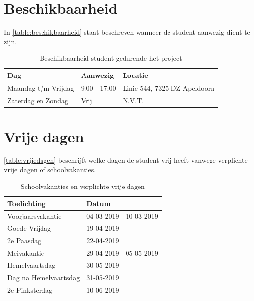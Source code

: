 \documentclass[a4paper, 11pt, oneside]{report}
\begin{document}
\section{Beschikbaarheid}
In \autoref{table:beschikbaarheid} staat beschreven wanneer de student aanwezig dient te zijn.

\begin{table}[H]
	\centering
	\begin{tabular}{|l|l|l|}
		\hline
		\rowcolor[HTML]{C0C0C0} 
		Dag                 & Aanwezig     & Locatie                                        \\ \hline
		Maandag t/m Vrijdag & 9:00 - 17:00 & Linie 544, 7325 DZ Apeldoorn 					\\ \hline
		Zaterdag en Zondag  & Vrij         & N.V.T.                                         \\ \hline
	\end{tabular}
\caption{Beschikbaarheid student gedurende het project}
\label{table:beschikbaarheid}
\end{table}

\section{Vrije dagen}

\autoref{table:vrijedagen} beschrijft welke dagen de student vrij heeft vanwege verplichte vrije dagen of schoolvakanties.

\begin{table}[H]
	\centering
	\begin{tabular}{|l|l|}
		\hline
		\rowcolor[HTML]{C0C0C0} 
		Toelichting           & Datum                           \\ \hline
		Voorjaarsvakantie     & 04-03-2019 - 10-03-2019 		\\ \hline
		Goede Vrijdag         & 19-04-2019                      \\ \hline
		2e Paasdag            & 22-04-2019                      \\ \hline
		Meivakantie           & 29-04-2019 - 05-05-2019         \\ \hline
		Hemelvaartsdag        & 30-05-2019                      \\ \hline
		Dag na Hemelvaartsdag & 31-05-2019                      \\ \hline
		2e Pinksterdag        & 10-06-2019                      \\ \hline
	\end{tabular}
\caption{Schoolvakanties en verplichte vrije dagen}
\label{table:vrijedagen}
\end{table}
\end{document}
